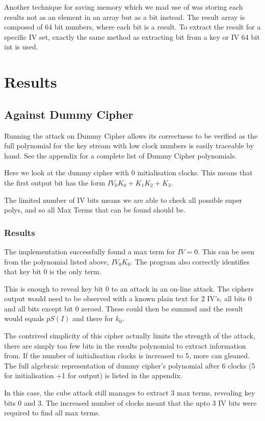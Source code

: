 \documentclass{report}
\let\Oldsection\section
\renewcommand{\section}{\FloatBarrier\Oldsection}
\let\Oldsubsection\subsection
\renewcommand{\subsection}{\FloatBarrier\Oldsubsection}
\let\Oldsubsubsection\subsubsection
\renewcommand{\subsubsection}{\FloatBarrier\Oldsubsubsection}
\begin{document}
Another technique for saving memory which we mad use of was storing each results not as an element in an array but as a bit instead. The result array is composed of 64 bit numbers, where each bit is a result. To extract the result for a specific IV set, exactly the same method as extracting bit from a key or IV 64 bit int is used.

\section{Results}
\subsection{Against Dummy Cipher}
Running the attack on Dummy Cipher allows its correctness to be verified as the full polynomial for the key stream with low clock numbers is easily traceable by hand. See the appendix for a complete list of Dummy Cipher polynomials.

Here we look at the dummy cipher with 0 initialisation clocks. This means that the first output bit has the form $IV_0K_0+K_1K_2+K_3$.

The limited number of IV bits means we are able to check all possible super polys, and so all Max Terms that can be found should be.
\subsubsection{Results}
The implementation successfully found a max term for $IV={0}$. This can be seen from the polynomial listed above, $IV_0K_0$. The program also correctly identifies that key bit 0 is the only term.

This is enough to reveal key bit 0 to an attack in an on-line attack. The ciphers output would need to be observed with a known plain text for 2 IV's, all bits 0 and all bits except bit 0 zeroed. These could then be summed and the result would equals $pS(I)$ and there for $k_0$.

The contrived simplicity of this cipher actually limits the strength of the attack, there are simply too few bits in the results polynomial to extract information from. If the number of initialisation clocks is increased to 5, more can gleaned. The full algebraic representation of dummy cipher's polynomial after 6 clocks (5 for initialisation +1 for output) is listed in the appendix.

In this case, the cube attack still manages to extract 3 max terms, revealing key bits 0 and 3. The increased number of clocks meant that the upto 3 IV bits were required to find all max terms.
\end{document}
